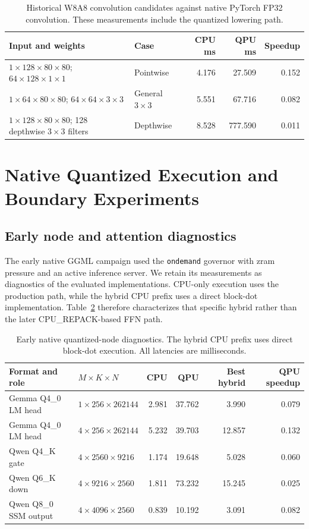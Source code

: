 \documentclass[sigplan,screen,review]{acmart}
\begin{document}
\begin{table}[t]
\centering
\caption{Historical W8A8 convolution candidates against native PyTorch FP32 convolution. These measurements include the quantized lowering path.}
\label{tab:w8-conv}
\small
\begin{tabular}{@{}llrrr@{}}
\toprule
Input and weights & Case & CPU ms & QPU ms & Speedup \\
\midrule
$1\times128\times80\times80$; $64\times128\times1\times1$ &
Pointwise & 4.176 & 27.509 & 0.152 \\
$1\times64\times80\times80$; $64\times64\times3\times3$ &
General $3\times3$ & 5.551 & 67.716 & 0.082 \\
$1\times128\times80\times80$; 128 depthwise $3\times3$ filters &
Depthwise & 8.528 & 777.590 & 0.011 \\
\bottomrule
\end{tabular}
\end{table}

\section{Native Quantized Execution and Boundary Experiments}
\label{app:ggml}

\subsection{Early node and attention diagnostics}

The early native GGML campaign used the \texttt{ondemand} governor with zram pressure and an active inference server. We retain its measurements as diagnostics of the evaluated implementations. CPU-only execution uses the production path, while the hybrid CPU prefix uses a direct block-dot implementation. Table~\ref{tab:native-diagnostics} therefore characterizes that specific hybrid rather than the later CPU\_REPACK-based FFN path.

\begin{table}[t]
\centering
\caption{Early native quantized-node diagnostics. The hybrid CPU prefix uses direct block-dot execution. All latencies are milliseconds.}
\label{tab:native-diagnostics}
\small
\begin{tabular}{@{}llrrrr@{}}
\toprule
Format and role & $M\times K\times N$ & CPU & QPU & Best hybrid & QPU speedup \\
\midrule
Gemma Q4\_0 LM head & $1\times256\times262144$ & 2.981 & 37.762 & 3.990 & 0.079 \\
Gemma Q4\_0 LM head & $4\times256\times262144$ & 5.232 & 39.703 & 12.857 & 0.132 \\
Qwen Q4\_K gate & $4\times2560\times9216$ & 1.174 & 19.648 & 5.028 & 0.060 \\
Qwen Q6\_K down & $4\times9216\times2560$ & 1.811 & 73.232 & 15.245 & 0.025 \\
Qwen Q8\_0 SSM output & $4\times4096\times2560$ & 0.839 & 10.192 & 3.091 & 0.082 \\
\bottomrule
\end{tabular}
\end{table}
\end{document}

